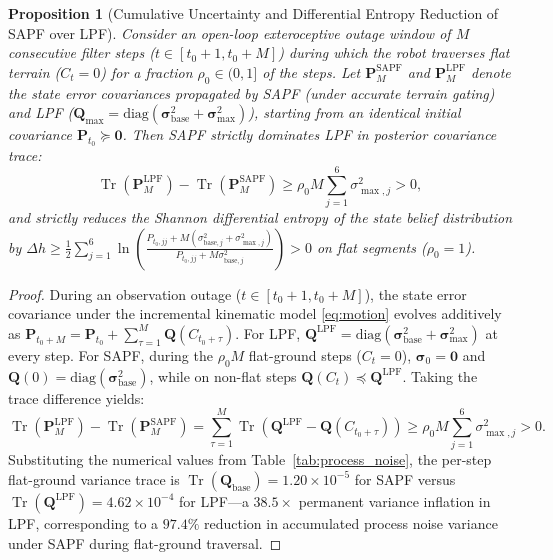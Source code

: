 \documentclass[11pt, a4paper]{article}
\newtheorem{proposition}{Proposition}
\begin{document}
\begin{proposition}[Cumulative Uncertainty and Differential Entropy Reduction of SAPF over LPF]
\label{prop:entropy}
Consider an open-loop exteroceptive outage window of $M$ consecutive filter steps ($t \in [t_0+1, t_0+M]$) during which the robot traverses flat terrain ($C_t = 0$) for a fraction $\rho_0 \in (0, 1]$ of the steps. Let $\mathbf{P}_M^{\text{SAPF}}$ and $\mathbf{P}_M^{\text{LPF}}$ denote the state error covariances propagated by SAPF (under accurate terrain gating) and LPF ($\mathbf{Q}_{\max} = \mathrm{diag}(\bm{\sigma}_{\text{base}}^2 + \bm{\sigma}_{\max}^2)$), starting from an identical initial covariance $\mathbf{P}_{t_0} \succeq \mathbf{0}$. Then SAPF strictly dominates LPF in posterior covariance trace:
\begin{equation}
\operatorname{Tr}(\mathbf{P}_M^{\text{LPF}}) - \operatorname{Tr}(\mathbf{P}_M^{\text{SAPF}}) \ge \rho_0 M \sum_{j=1}^6 \sigma_{\max,j}^2 > 0,
\end{equation}
and strictly reduces the Shannon differential entropy of the state belief distribution by $\Delta h \ge \frac{1}{2}\sum_{j=1}^6 \ln\left(\frac{P_{t_0,jj} + M(\sigma_{\text{base},j}^2 + \sigma_{\max,j}^2)}{P_{t_0,jj} + M\sigma_{\text{base},j}^2}\right) > 0$ on flat segments ($\rho_0 = 1$).
\end{proposition}
\begin{proof}
During an observation outage ($t \in [t_0+1, t_0+M]$), the state error covariance under the incremental kinematic model \eqref{eq:motion} evolves additively as $\mathbf{P}_{t_0+M} = \mathbf{P}_{t_0} + \sum_{\tau=1}^M \mathbf{Q}(C_{t_0+\tau})$. For LPF, $\mathbf{Q}^{\text{LPF}} = \mathrm{diag}(\bm{\sigma}_{\text{base}}^2 + \bm{\sigma}_{\max}^2)$ at every step. For SAPF, during the $\rho_0 M$ flat-ground steps ($C_t = 0$), $\bm{\sigma}_0 = \mathbf{0}$ and $\mathbf{Q}(0) = \mathrm{diag}(\bm{\sigma}_{\text{base}}^2)$, while on non-flat steps $\mathbf{Q}(C_t) \preceq \mathbf{Q}^{\text{LPF}}$. Taking the trace difference yields:
\begin{equation}
\operatorname{Tr}(\mathbf{P}_M^{\text{LPF}}) - \operatorname{Tr}(\mathbf{P}_M^{\text{SAPF}}) = \sum_{\tau=1}^M \operatorname{Tr}\!\left(\mathbf{Q}^{\text{LPF}} - \mathbf{Q}(C_{t_0+\tau})\right) \ge \rho_0 M \sum_{j=1}^6 \sigma_{\max,j}^2 > 0.
\end{equation}
Substituting the numerical values from Table~\ref{tab:process_noise}, the per-step flat-ground variance trace is $\operatorname{Tr}(\mathbf{Q}_{\text{base}}) = 1.20 \times 10^{-5}$ for SAPF versus $\operatorname{Tr}(\mathbf{Q}^{\text{LPF}}) = 4.62 \times 10^{-4}$ for LPF—a $38.5\times$ permanent variance inflation in LPF, corresponding to a $97.4\%$ reduction in accumulated process noise variance under SAPF during flat-ground traversal.
\end{proof}
\end{document}
